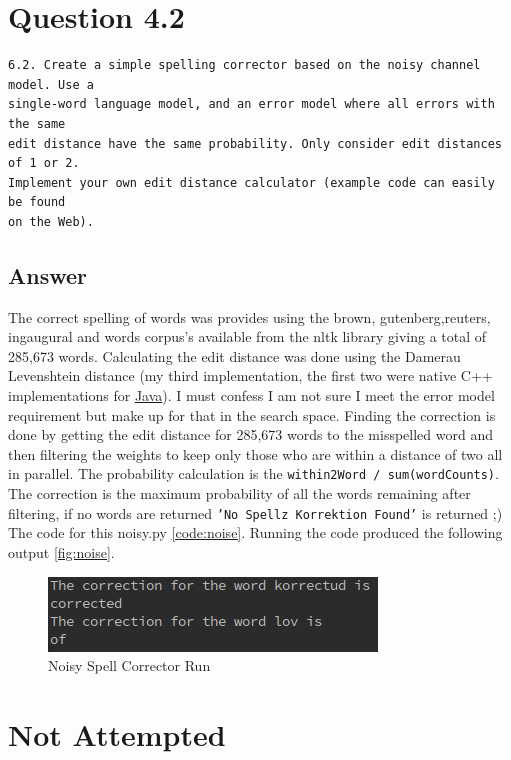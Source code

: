 \documentclass[11pt]{article}
\newenvironment{code}{\captionsetup{type=listing}}{}
\begin{document}
\begin{code}
\label{code:associations}
\end{code}
\newpage
\section{Question 4.2}
\begin{verbatim}
6.2. Create a simple spelling corrector based on the noisy channel model. Use a
single-word language model, and an error model where all errors with the same
edit distance have the same probability. Only consider edit distances of 1 or 2.
Implement your own edit distance calculator (example code can easily be found
on the Web).
\end{verbatim}
\subsection{Answer}
The correct spelling of words was provides using the brown, gutenberg,reuters, ingaugural and words corpus's available from the nltk library giving a total of 285,673 words. Calculating the edit distance was done using the Damerau Levenshtein distance (my third implementation, the first two were native C++ implementations for \href{https://github.com/N0taN3rd/Native-To-Java-StringUtils}{Java}). I must confess I am not sure I meet the error model requirement but make up for that in the search space. Finding the correction is done by getting the edit distance for 285,673 words to the misspelled word and then filtering the weights to keep only those who are within a distance of two all in parallel. The probability calculation is the \texttt{within2Word / sum(wordCounts)}. The correction is the maximum probability of all the words remaining after filtering, if no words are returned \texttt{'No Spellz Korrektion Found'} is returned ;) \newline The code for this noisy.py \autoref{code:noise}.
Running the code  produced the following output \autoref{fig:noise}.
\begin{figure}[H]
\centering
\includegraphics[scale=0.8]{noisy.png}
\caption{Noisy Spell Corrector Run}
\label{fig:noise}
\end{figure}
\begin{code}
\label{code:noise}
\end{code}
\section{Not Attempted}
\newpage
\begin{code}
 \label{code:rg}
\end{code}
\end{document}
